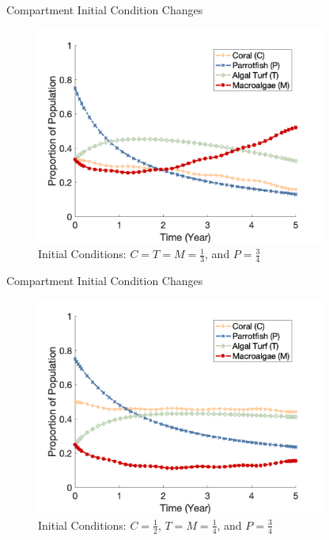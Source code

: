 \documentclass{beamer}
\begin{document}
\begin{frame}{Compartment Initial Condition Changes}
    \begin{figure}
        \centering
        \includegraphics[width=0.85\textwidth]{Latex/Figures/0.3C_0.3T_0.3M.png}
        \caption{Initial Conditions: $C = T = M = \frac{1}{3}$, and $P = \frac{3}{4}$}
        \label{fig:initial_plot}
    \end{figure}
\end{frame}

\begin{frame}{Compartment Initial Condition Changes}
    \begin{figure}
        \centering
        \includegraphics[width=0.85\textwidth]{Latex/Figures/0.5C_0.25T_0.25M.png}
        \caption{Initial Conditions: $C = \frac{1}{2}$, $T = M = \frac{1}{4}$, and $P = \frac{3}{4}$}
        \label{fig:coral_dominant}
    \end{figure}
\end{frame}
\end{document}

